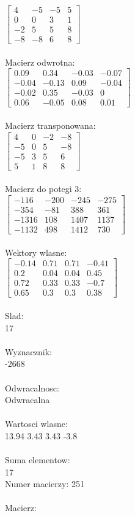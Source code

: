 \documentclass[a4paper,12pt]{article}
\begin{document}
$\begin{bmatrix} 4&-5&-5&5\\0&0&3&1\\-2&5&5&8\\-8&-8&6&8 \end{bmatrix}$
\\
\\
Macierz odwrotna:\\

$\begin{bmatrix} 0.09&0.34&-0.03&-0.07\\-0.04&-0.13&0.09&-0.04\\-0.02&0.35&-0.03&0\\0.06&-0.05&0.08&0.01 \end{bmatrix}$
\\
\\
Macierz transponowana:\\

$\begin{bmatrix} 4&0&-2&-8\\-5&0&5&-8\\-5&3&5&6\\5&1&8&8 \end{bmatrix}$
\\
\\
Macierz do potegi 3:\\

$\begin{bmatrix} -116&-200&-245&-275\\-354&-81&388&361\\-1316&108&1407&1137\\-1132&498&1412&730 \end{bmatrix}$
\\
\\
Wektory wlasne:\\

$\begin{bmatrix} -0.14&0.71&0.71&-0.41\\0.2&0.04&0.04&0.45\\0.72&0.33&0.33&-0.7\\0.65&0.3&0.3&0.38 \end{bmatrix}$
\\
\\
Slad:\\
17
\\
\\
Wyznacznik:\\
-2668
\\
\\
Odwracalnosc:\\
Odwracalna
\\
\\
Wartosci wlasne:\\
13.94 3.43 3.43 -3.8
\\
\\
Suma elementow:\\
17
\\
\newpage
Numer macierzy:
251
\\
\\
Macierz:\\
\end{document}
